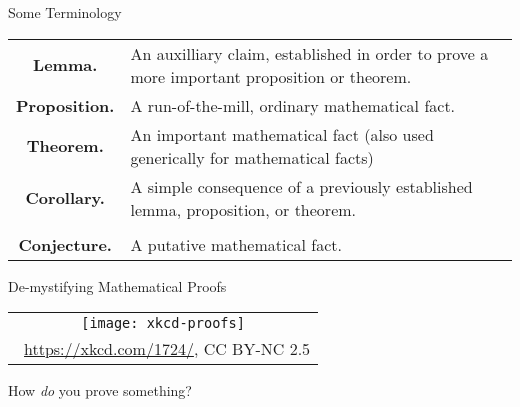 \begin{frame}{Some Terminology}

	\begin{center}
	
		\begin{tabular}{c  p{.75\linewidth}}
			
			\textbf{Lemma.} & An auxilliary claim, established in order to prove a more important proposition or theorem.\\
			
			\textbf{Proposition.} & A run-of-the-mill, ordinary mathematical fact.\\
			
			\textbf{Theorem.} & An important mathematical fact (also used generically for mathematical facts)\\
			
			\textbf{Corollary.} & A simple consequence of a previously established lemma, proposition, or theorem.\\[2ex]
			
	\hline\\[2ex]
	
	
\textbf{Conjecture.} & A putative mathematical fact.	
	
	
		\end{tabular}
	\end{center}


\end{frame}

\begin{frame}{De-mystifying Mathematical Proofs}

	\begin{center}
		\begin{tabular}{c}
		\texttt{[image: xkcd-proofs]}\\[-1ex]
		{\tiny \textcopyright~\url{https://xkcd.com/1724/}, CC BY-NC 2.5}
		\end{tabular}
		\end{center}
		
	How \emph{do} you prove something?

\end{frame}

